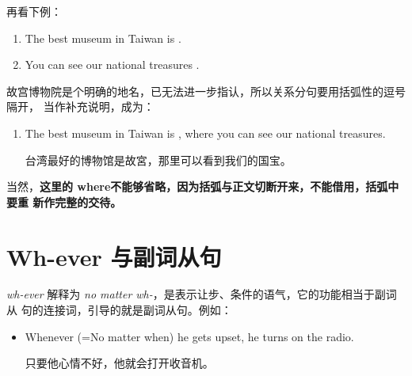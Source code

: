再看下例：
\begin{enumerate}
\item   The best museum in Taiwan is  .
\item   You can see our national treasures .
\end{enumerate}
故宫博物院是个明确的地名，已无法进一步指认，所以关系分句要用括弧性的逗号隔开，
当作补充说明，成为：
\begin{enumerate}[resume]
\item The best museum in Taiwan is , where you
  can see our national treasures.

  台湾最好的博物馆是故宮，那里可以看到我们的国宝。
\end{enumerate}
当然，\textbf{这里的 where不能够省略，因为括弧与正文切断开来，不能借用，括弧中要重
  新作完整的交待。}

\section{Wh-ever 与副词从句}

\emph{wh-ever} 解释为 \emph{no matter wh-}，是表示让步、条件的语气，它的功能相当于副词从
句的连接词，引导的就是副词从句。例如：

\begin{itemize}
\item Whenever (=No matter when) he gets upset, he turns on the radio.

  只要他心情不好，他就会打开收音机。
\end{itemize}

